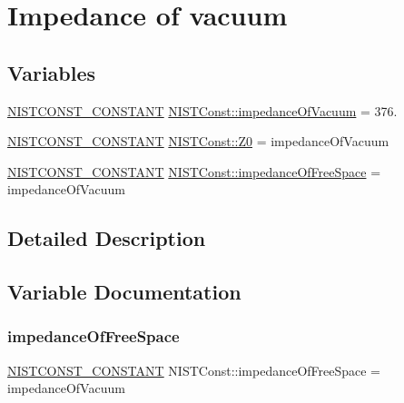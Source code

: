 \hypertarget{group___n_i_s_t_const-_impedance_of_vacuum}{}\section{Impedance of vacuum}
\label{group___n_i_s_t_const-_impedance_of_vacuum}
\subsection*{Variables}
\begin{DoxyCompactItemize}
\item 
\mbox{\hyperlink{group___n_i_s_t_const-_macros_ga2b0fc1d7452373f816175dd86ce26729}{N\+I\+S\+T\+C\+O\+N\+S\+T\+\_\+\+C\+O\+N\+S\+T\+A\+NT}} \mbox{\hyperlink{group___n_i_s_t_const-_impedance_of_vacuum_gaed60576e7b6ccd87ca6204e09efd98ee}{N\+I\+S\+T\+Const\+::impedance\+Of\+Vacuum}} = 376.
\item 
\mbox{\hyperlink{group___n_i_s_t_const-_macros_ga2b0fc1d7452373f816175dd86ce26729}{N\+I\+S\+T\+C\+O\+N\+S\+T\+\_\+\+C\+O\+N\+S\+T\+A\+NT}} \mbox{\hyperlink{group___n_i_s_t_const-_impedance_of_vacuum_ga6015120b458e0758f594ead095f54939}{N\+I\+S\+T\+Const\+::\+Z0}} = impedance\+Of\+Vacuum
\item 
\mbox{\hyperlink{group___n_i_s_t_const-_macros_ga2b0fc1d7452373f816175dd86ce26729}{N\+I\+S\+T\+C\+O\+N\+S\+T\+\_\+\+C\+O\+N\+S\+T\+A\+NT}} \mbox{\hyperlink{group___n_i_s_t_const-_impedance_of_vacuum_ga6f2120c85be2e01547f662c230bde661}{N\+I\+S\+T\+Const\+::impedance\+Of\+Free\+Space}} = impedance\+Of\+Vacuum
\end{DoxyCompactItemize}


\subsection{Detailed Description}


\subsection{Variable Documentation}
\mbox{\label{group___n_i_s_t_const-_impedance_of_vacuum_ga6f2120c85be2e01547f662c230bde661}} 
\subsubsection{\texorpdfstring{impedance\+Of\+Free\+Space}{impedanceOfFreeSpace}}
{\footnotesize\ttfamily \mbox{\hyperlink{group___n_i_s_t_const-_macros_ga2b0fc1d7452373f816175dd86ce26729}{N\+I\+S\+T\+C\+O\+N\+S\+T\+\_\+\+C\+O\+N\+S\+T\+A\+NT}} N\+I\+S\+T\+Const\+::impedance\+Of\+Free\+Space = impedance\+Of\+Vacuum}

